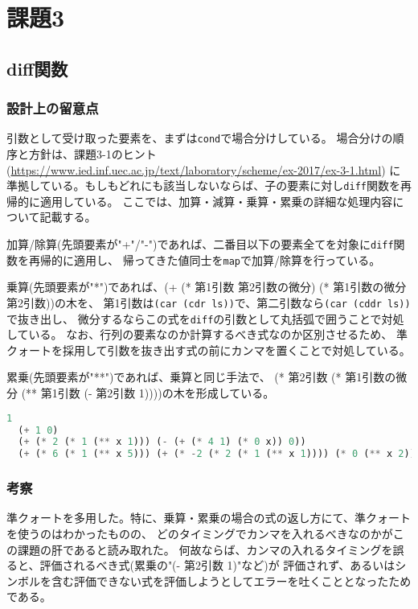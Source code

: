 \documentclass[11pt,a4paper, uplatex]{jsarticle}
\begin{document}
\section{課題3}
\subsection{diff関数}
\subsubsection{設計上の留意点}
引数として受け取った要素を、まずは\texttt{cond}で場合分けしている。
場合分けの順序と方針は、課題3-1のヒント
(\url{https://www.ied.inf.uec.ac.jp/text/laboratory/scheme/ex-2017/ex-3-1.html})
に準拠している。もしもどれにも該当しないならば、子の要素に対し\texttt{diff}関数を再帰的に適用している。
ここでは、加算・減算・乗算・累乗の詳細な処理内容について記載する。

加算/除算(先頭要素が"+"/"-")であれば、二番目以下の要素全てを対象に\texttt{diff}関数を再帰的に適用し、
帰ってきた値同士を\texttt{map}で加算/除算を行っている。

乗算(先頭要素が"*")であれば、(+ (* 第1引数 第2引数の微分) (* 第1引数の微分 第2引数))の木を、
第1引数は\texttt{(car (cdr ls))}で、第二引数なら\texttt{(car (cddr ls))}で抜き出し、
微分するならこの式を\texttt{diff}の引数として丸括弧で囲うことで対処している。
なお、行列の要素なのか計算するべき式なのか区別させるため、
準クォートを採用して引数を抜き出す式の前にカンマを置くことで対処している。

累乗(先頭要素が"**")であれば、乗算と同じ手法で、
(* 第2引数 (* 第1引数の微分 (** 第1引数 (- 第2引数 1))))の木を形成している。

\begin{lstlisting}[language=lisp, breaklines=true, caption=\texttt{diff}関数実行例]
  1
  (+ 1 0)
  (+ (* 2 (* 1 (** x 1))) (- (+ (* 4 1) (* 0 x)) 0))
  (+ (* 6 (* 1 (** x 5))) (+ (* -2 (* 2 (* 1 (** x 1)))) (* 0 (** x 2))) 0)
\end{lstlisting}
\subsubsection{考察}
準クォートを多用した。特に、乗算・累乗の場合の式の返し方にて、準クォートを使うのはわかったものの、
どのタイミングでカンマを入れるべきなのかがこの課題の肝であると読み取れた。
何故ならば、カンマの入れるタイミングを誤ると、評価されるべき式(累乗の"(- 第2引数 1)"など)が
評価されず、あるいはシンボルを含む評価できない式を評価しようとしてエラーを吐くこととなったためである。
\end{document}
